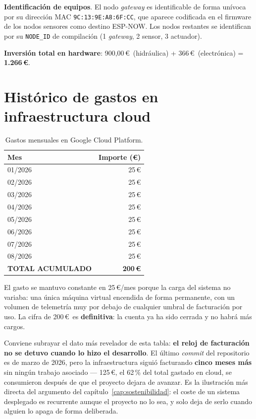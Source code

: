 \textbf{Identificaci\'on de equipos}. El nodo \textit{gateway} es
identificable de forma un\'ivoca por su direcci\'on MAC
\texttt{9C:13:9E:A8:6F:CC}, que aparece codificada en el firmware de los
nodos sensores como destino ESP-NOW. Los nodos restantes se identifican
por su \texttt{NODE\_ID} de compilaci\'on (1 \textit{gateway},
2 sensor, 3 actuador).

\textbf{Inversi\'on total en hardware}: 900,00\,\euro\ (hidr\'aulica) +
366\,\euro\ (electr\'onica) = \textbf{1.266\,\euro}.

\section{Hist\'orico de gastos en infraestructura cloud}

\begin{table}[H]
    \centering
    \caption{Gastos mensuales en Google Cloud Platform.}
    \label{tab:cloud_historico}
    \begin{tabular}{lr}
        \toprule
        \textbf{Mes} & \textbf{Importe (\textbf{\euro})} \\
        \midrule
        01/2026 & 25\,\euro \\
        02/2026 & 25\,\euro \\
        03/2026 & 25\,\euro \\
        04/2026 & 25\,\euro \\
        05/2026 & 25\,\euro \\
        06/2026 & 25\,\euro \\
        07/2026 & 25\,\euro \\
        08/2026 & 25\,\euro \\
        \midrule
        \textbf{TOTAL ACUMULADO} & \textbf{200\,\euro} \\
        \bottomrule
    \end{tabular}
\end{table}

El gasto se mantuvo constante en 25\,\euro/mes porque la carga del
sistema no variaba: una \'unica m\'aquina virtual encendida de forma
permanente, con un volumen de telemetr\'ia muy por debajo de cualquier
umbral de facturaci\'on por uso. La cifra de 200\,\euro\ es
\textbf{definitiva}: la cuenta ya ha sido cerrada y no habr\'a m\'as
cargos.

Conviene subrayar el dato m\'as revelador de esta tabla: \textbf{el reloj
de facturaci\'on no se detuvo cuando lo hizo el desarrollo}. El \'ultimo
\textit{commit} del repositorio es de marzo de 2026, pero la
infraestructura sigui\'o facturando \textbf{cinco meses m\'as} sin ning\'un
trabajo asociado --- 125\,\euro, el 62\,\% del total gastado en cloud, se
consumieron despu\'es de que el proyecto dejara de avanzar. Es la
ilustraci\'on m\'as directa del argumento del
cap\'itulo~\ref{cap:sostenibilidad}: el coste de un sistema desplegado es
recurrente aunque el proyecto no lo sea, y solo deja de serlo cuando
alguien lo apaga de forma deliberada.

